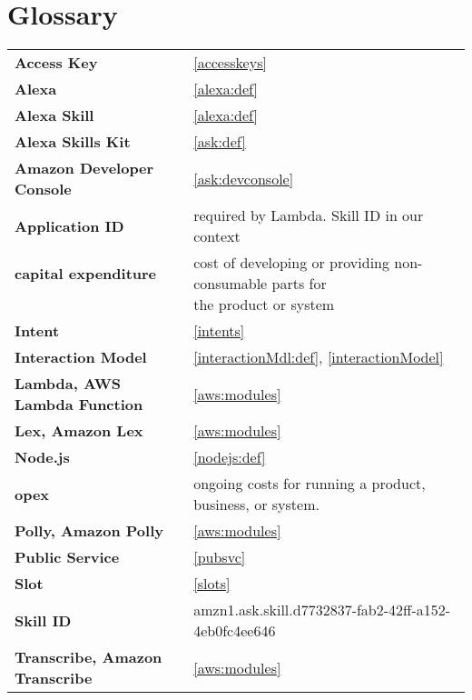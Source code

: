 \section*{Glossary}
%

\begin{flushleft}
\begin{tabular}{ll}

\textbf{Access Key}			&	 	\ref{accesskeys}\\


\textbf{Alexa}				&		\ref{alexa:def}\\
\textbf{Alexa Skill}		&		\ref{alexa:def}\\
\textbf{Alexa Skills Kit}	&		\ref{ask:def}\\
\textbf{Amazon Developer Console}&	\ref{ask:devconsole}\\

\textbf{Application ID}		&	required by Lambda. Skill ID in our context\\

\shortstack[l]{\textbf{capital expenditure}\\ \textcolor{white}{x}}	&	\shortstack[l]{cost of developing or providing non-consumable parts for \\ the product or system}\\


\textbf{Intent}				&		\ref{intents}\\
\textbf{Interaction Model}	&		\ref{interactionMdl:def}, \ref{interactionModel}\\



\textbf{Lambda, AWS Lambda Function}	&		\ref{aws:modules}\\
\textbf{Lex, Amazon Lex}	&		\ref{aws:modules}\\

\textbf{Node.js}			&		\ref{nodejs:def}\\

\textbf{opex}				&  ongoing costs for running a product, business, or system. \\


\textbf{Polly, Amazon Polly}&		\ref{aws:modules}\\
\textbf{Public Service}			&	\ref{pubsvc}\\
\textbf{Slot}				&		\ref{slots}\\
\textbf{Skill ID}			&	amzn1.ask.skill.d7732837-fab2-42ff-a152-4eb0fc4ee646\\
\textbf{Transcribe, Amazon Transcribe}	&		\ref{aws:modules}\\


\end{tabular}
\end{flushleft}
